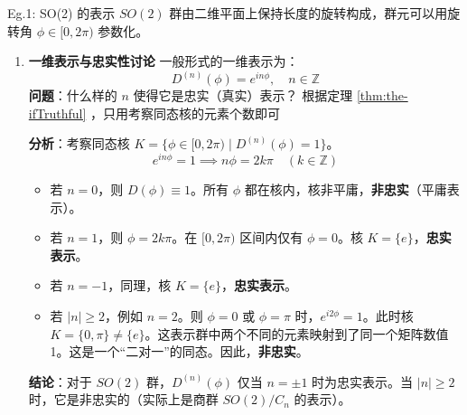 \begin{example}{Eg.1: SO(2) 的表示}
    $SO(2)$ 群由二维平面上保持长度的旋转构成，群元可以用旋转角 $\phi \in [0, 2\pi)$ 参数化。
    
    \begin{enumerate}
        \item \textbf{一维表示与忠实性讨论}
    一般形式的一维表示为：
    \begin{equation}
        D^{(n)}(\phi) = e^{in\phi}, \quad n \in \mathbb{Z}
    \end{equation}
    \textbf{问题}：什么样的 $n$ 使得它是忠实（真实）表示？
    根据定理 \ref{thm:the-ifTruthful} ，只用考察同态核的元素个数即可

    \textbf{分析}：考察同态核 $K = \{ \phi \in [0, 2\pi) \mid D^{(n)}(\phi) = 1 \}$。
    \begin{equation}
        e^{in\phi} = 1 \implies n\phi = 2k\pi \quad (k \in \mathbb{Z})
    \end{equation}
    \begin{itemize}
        \item 若 $n=0$，则 $D(\phi) \equiv 1$。所有 $\phi$ 都在核内，核非平庸，\textbf{非忠实}（平庸表示）。
        \item 若 $n=1$，则 $\phi = 2k\pi$。在 $[0, 2\pi)$ 区间内仅有 $\phi=0$。核 $K=\{e\}$，\textbf{忠实表示}。
        \item 若 $n=-1$，同理，核 $K=\{e\}$，\textbf{忠实表示}。
        \item 若 $|n| \ge 2$，例如 $n=2$。则 $\phi = 0$ 或 $\phi = \pi$ 时，$e^{i2\phi}=1$。此时核 $K=\{0, \pi\} \neq \{e\}$。这表示群中两个不同的元素映射到了同一个矩阵数值 1。这是一个“二对一”的同态。因此，\textbf{非忠实}。
    \end{itemize}
    \textbf{结论}：对于 $SO(2)$ 群，$D^{(n)}(\phi)$ 仅当 $n = \pm 1$ 时为忠实表示。当 $|n| \ge 2$ 时，它是非忠实的（实际上是商群 $SO(2)/C_n$ 的表示）。


\end{enumerate}
\end{example}
